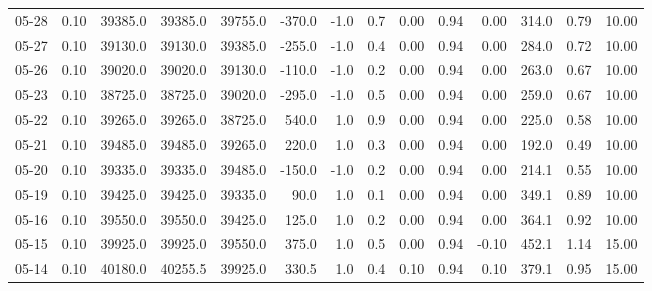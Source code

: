 \begin{threeparttable}
{\begin{tabular}{lrrrrrrrrrrrrr}
  05-28 &     0.10 & 39385.0 & 39385.0 & 39755.0 &     -370.0 &                     -1.0 &                 0.7 &       0.00 &      0.94 &           0.00 &            314.0 &            0.79 &                  10.00 \\
  05-27 &     0.10 & 39130.0 & 39130.0 & 39385.0 &     -255.0 &                     -1.0 &                 0.4 &       0.00 &      0.94 &           0.00 &            284.0 &            0.72 &                  10.00 \\
  05-26 &     0.10 & 39020.0 & 39020.0 & 39130.0 &     -110.0 &                     -1.0 &                 0.2 &       0.00 &      0.94 &           0.00 &            263.0 &            0.67 &                  10.00 \\
  05-23 &     0.10 & 38725.0 & 38725.0 & 39020.0 &     -295.0 &                     -1.0 &                 0.5 &       0.00 &      0.94 &           0.00 &            259.0 &            0.67 &                  10.00 \\
  05-22 &     0.10 & 39265.0 & 39265.0 & 38725.0 &      540.0 &                      1.0 &                 0.9 &       0.00 &      0.94 &           0.00 &            225.0 &            0.58 &                  10.00 \\
  05-21 &     0.10 & 39485.0 & 39485.0 & 39265.0 &      220.0 &                      1.0 &                 0.3 &       0.00 &      0.94 &           0.00 &            192.0 &            0.49 &                  10.00 \\
  05-20 &     0.10 & 39335.0 & 39335.0 & 39485.0 &     -150.0 &                     -1.0 &                 0.2 &       0.00 &      0.94 &           0.00 &            214.1 &            0.55 &                  10.00 \\
  05-19 &     0.10 & 39425.0 & 39425.0 & 39335.0 &       90.0 &                      1.0 &                 0.1 &       0.00 &      0.94 &           0.00 &            349.1 &            0.89 &                  10.00 \\
  05-16 &     0.10 & 39550.0 & 39550.0 & 39425.0 &      125.0 &                      1.0 &                 0.2 &       0.00 &      0.94 &           0.00 &            364.1 &            0.92 &                  10.00 \\
  05-15 &     0.10 & 39925.0 & 39925.0 & 39550.0 &      375.0 &                      1.0 &                 0.5 &       0.00 &      0.94 &          -0.10 &            452.1 &            1.14 &                  15.00 \\
  05-14 &     0.10 & 40180.0 & 40255.5 & 39925.0 &      330.5 &                      1.0 &                 0.4 &       0.10 &      0.94 &           0.10 &            379.1 &            0.95 &                  15.00 \\

\end{tabular}}
\end{threeparttable}
